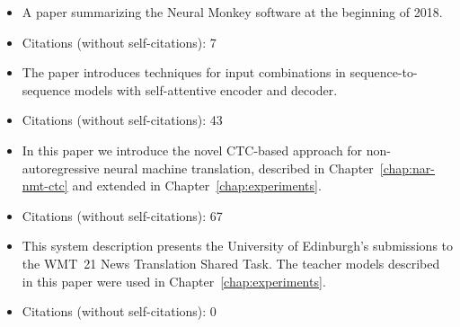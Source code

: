 \noindent{}
\begin{itemize}[noitemsep,topsep=0pt]

\item A paper summarizing the Neural Monkey software at the beginning of 2018.

\item Citations (without self-citations): 7
\end{itemize}\vspace{.5\baselineskip}

\noindent{}
\begin{itemize}[noitemsep,topsep=0pt]

\item The paper introduces techniques for input combinations in
  sequence-to-sequence models with self-attentive encoder and decoder.

\item Citations (without self-citations): 43
\end{itemize}\vspace{.5\baselineskip}

\noindent{}
\begin{itemize}[noitemsep,topsep=0pt]

\item In this paper we introduce the novel CTC-based approach for
  non-autoregressive neural machine translation, described in
  Chapter~\ref{chap:nar-nmt-ctc} and extended in
  Chapter~\ref{chap:experiments}.

\item Citations (without self-citations): 67
\end{itemize}\vspace{.5\baselineskip}

\noindent{}
\begin{itemize}[noitemsep,topsep=0pt]

\item This system description presents the University of Edinburgh's
  submissions to the WMT~21 News Translation Shared Task. The teacher models
  described in this paper were used in Chapter~\ref{chap:experiments}.

\item Citations (without self-citations): 0 
\end{itemize}\vspace{.5\baselineskip}

